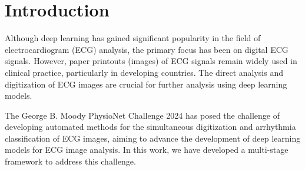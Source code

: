\section{Introduction}
\label{sec:intro}



Although deep learning has gained significant popularity in the field of electrocardiogram (ECG) analysis, the primary focus has been on digital ECG signals. However, paper printouts (images) of ECG signals remain widely used in clinical practice, particularly in developing countries. The direct analysis and digitization of ECG images are crucial for further analysis using deep learning models.


The George B. Moody PhysioNet Challenge 2024 \cite{goldberger2000physionet, cinc2024} has posed the challenge of developing automated methods for the simultaneous digitization and arrhythmia classification of ECG images, aiming to advance the development of deep learning models for ECG image analysis. In this work, we have developed a multi-stage framework to address this challenge.
